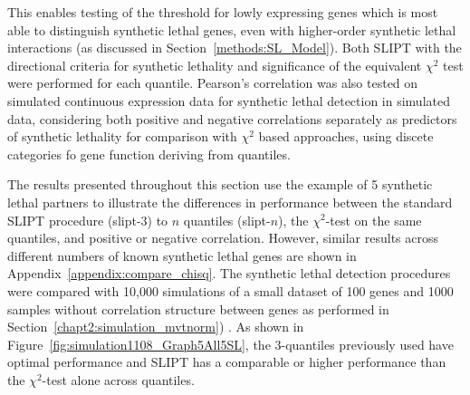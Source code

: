 This enables testing of the threshold for lowly expressing genes which is most able to distinguish synthetic lethal genes, even with higher-order synthetic lethal interactions (as discussed in Section~\ref{methods:SL_Model}). Both \gls{SLIPT} with the directional criteria for synthetic lethality and significance of the equivalent $\chi^2$ test were performed for each quantile. Pearson's correlation was also tested on simulated continuous expression data for synthetic lethal detection in simulated data, considering both positive and negative correlations separately as predictors of synthetic lethality for comparison with $\chi^2$ based approaches, using discete categories fo gene function deriving from quantiles. 

The results presented throughout this section use the example of 5 synthetic lethal partners to illustrate the differences in performance between the standard \gls{SLIPT} procedure (slipt-3) to $n$ quantiles (slipt-$n$), the $\chi^2$-test on the same quantiles, and positive or negative correlation. However, similar results across different numbers of known synthetic lethal genes are shown in Appendix~\ref{appendix:compare_chisq}. The synthetic lethal detection procedures were compared with 10,000 simulations of a small dataset of 100 genes and 1000 samples without correlation structure between genes as performed in Section~\ref{chapt2:simulation_mvtnorm}) . As shown in Figure~\ref{fig:simulation1108_Graph5All5SL}, the 3-quantiles previously used have optimal performance and \gls{SLIPT} has a comparable or higher performance than the $\chi^2$-test alone across quantiles.

